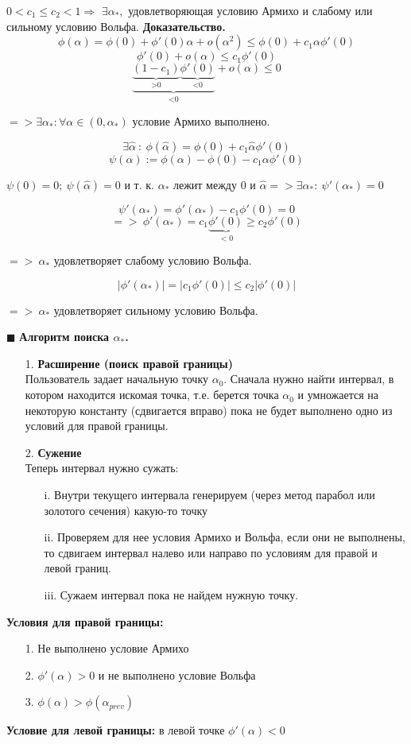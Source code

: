 $0<c_1\leq c_2<1 \Rightarrow$ \newline
$\exists \alpha_*,$ удовлетворяющая условию Армихо и слабому или сильному условию Вольфа.
\newline \textbf{Доказательство.}
$$\phi(\alpha)=\phi(0)+\phi'(0) \alpha + o(\alpha^2) \leq \phi(0)+c_1\alpha\phi'(0)$$
$$\phi'(0)+o(\alpha)\leq c_1 \phi'(0)$$
$$\underbrace{\underbrace{(1 -c_1)}_{\text{>0}}\underbrace{\phi'(0)}_{\text{<0}}}_{\text{<0}}+o(\alpha)\leq 0$$
\begin{center}
    $=> \exists \alpha_*: \forall \alpha \in (0, \alpha_*)$
    условие Армихо выполнено.
\end{center}
$$\exists \hat{\alpha} \ : \ \phi(\hat{\alpha})=\phi(0)+c_1 \hat{\alpha}  \phi'(0)$$
$$\psi(\alpha) := \phi(\alpha)-\phi(0)-c_1\alpha\phi'(0) $$
\begin{center}
    $\psi(0)=0; \ \psi(\hat{\alpha})=0$
    и т. к. $\alpha_*$ лежит между 0 и $\hat{\alpha} => \exists \alpha_* : \ \psi'(\alpha_*)=0$
\end{center}
$$\psi'(\alpha_*)=\phi'(\alpha_*)-c_1 \phi'(0)=0 $$
$$=> \ \phi'(\alpha_*)=c_1 \underbrace{\phi'(0)}_{<0} \geq c_2 \phi'(0)$$
\begin{center}
    $=> \ \alpha_*$ удовлетворяет слабому условию Вольфа.
\end{center}
$$|\phi'(\alpha_*)|=|c_1\phi'(0)|\leq c_2 |\phi'(0)|$$
\begin{center}
    $=> \ \alpha_*$ удовлетворяет сильному условию Вольфа.
\end{center}
\hfill$\scriptstyle\blacksquare$
\textbf{Алгоритм поиска $\alpha_*$.}
\begin{itemize}
    \item[1.] \textbf{Расширение (поиск правой границы)} \\
    Пользователь задает начальную точку $\alpha_0$. Сначала нужно найти интервал, в котором находится искомая точка, т.е. берется точка $\alpha_0$ и умножается на некоторую константу (сдвигается вправо) пока не будет выполнено одно из условий для правой границы.
    \item[2.] \textbf{Сужение} \\
    Теперь интервал нужно сужать:
    \begin{itemize}
        \item[i.] Внутри текущего интервала генерируем (через метод парабол или золотого сечения) какую-то точку
        \item[ii.] Проверяем для нее условия Армихо и Вольфа, если они не выполнены, то сдвигаем интервал налево или направо по условиям для правой и левой границ.
        \item[iii.] Сужаем интервал пока не найдем нужную точку.
    \end{itemize}
\end{itemize}
\textbf{ Условия для правой границы:}
\begin{itemize}
    \item[1.] Не выполнено условие Армихо
    \item[2.] $\phi'(\alpha)>0$ и не выполнено условие Вольфа
    \item[3.] $\phi(\alpha)>\phi(\alpha_{prev})$
\end{itemize}
\textbf{ Условие для левой границы:} в левой точке $\phi'(\alpha)<0$